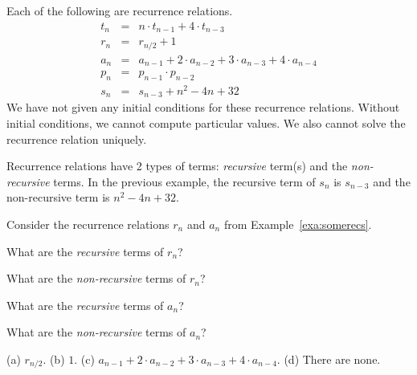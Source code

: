 \vspace*{-.05in} %

\begin{exa}\label{exa:somerecs}
Each of the following are recurrence relations.
\begin{eqnarray*}
t_n &=& n\cdot t_{n-1} + 4\cdot t_{n-3}\\
r_n &=& r_{n/2}+1\\
a_n &=& a_{n-1}+2\cdot a_{n-2}+3\cdot a_{n-3}+4\cdot a_{n-4}\\
p_n &=& p_{n-1}\cdot p_{n-2}\\
s_n &=& s_{n-3} + n^2 - 4 n + 32
\end{eqnarray*}
We have not given any initial conditions for these recurrence relations.
Without initial conditions, we cannot compute particular values.
We also cannot solve the recurrence relation uniquely.
\end{exa}

Recurrence relations have 2 types of terms: {\em recursive} term(s) and
the {\em non-recursive} terms.
In the previous example, the recursive term of $s_n$ is $s_{n-3}$
and the non-recursive term is  $n^2 - 4 n + 32$.  

\begin{ques}
Consider the recurrence relations $r_n$ and $a_n$ from Example~\ref{exa:somerecs}.
\begin{lenum}
\item
What are the {\em recursive} terms of $r_n$?

\noindent
\answerline
\item
What are the {\em non-recursive} terms of $r_n$?

\noindent
\answerline
\item
What are the {\em recursive} terms of $a_n$?

\noindent
\answerline
\item
What are the {\em non-recursive} terms of $a_n$?

\noindent
\answerline
\end{lenum}
\begin{answer}
(a) $r_{n/2}$.
(b) $1$.
(c) $a_{n-1}+2\cdot a_{n-2}+3\cdot a_{n-3}+4\cdot a_{n-4}$.
(d) There are none.
\end{answer}
\end{ques}

